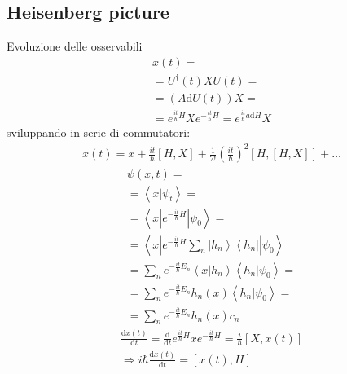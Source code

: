 \subsection{Heisenberg picture} %
Evoluzione delle osservabili
\begin{equation}\begin{split}
x\left(t\right)=\\
=U^\dag\left(t\right) XU\left(t\right)=\\
=\left(A\textrm{d}U\left(t\right)\right)X=\\
=e^{\frac{it}{\hbar }H}Xe^{-\frac{it}{\hbar }H}=e^{\frac{it}{\hbar }a\textrm{d}H}X
\end{split}\end{equation}
sviluppando in serie di commutatori:
\begin{equation}\begin{split}
x\left(t\right)=x+\frac{it}{\hbar }\left[H,X\right]+\frac{1}{2!}\left(\frac{it}{\hbar }\right)^2\left[H,\left[H,X\right]\right]+\dots
\end{split}\end{equation}
\begin{equation}\begin{split}
\psi \left(x,t\right)=\\
=\left\langle x|\psi _t \right\rangle=\\
=\left\langle x|e^{-\frac{it}{\hbar }H}|\psi _0 \right\rangle=\\
=\left\langle x|e^{-\frac{it}{\hbar }H}\sum_n{\left |h_n \right\rangle\left\langle h_n\right |}|\psi _0 \right\rangle\\
=\sum_n{e^{-\frac{it}{\hbar }E_n}\left\langle x|h_n \right\rangle\left\langle h_n|\psi _0 \right\rangle}=\\
=\sum_n{e^{-\frac{it}{\hbar }E_n}h_n\left(x\right)\left\langle h_n|\psi _0 \right\rangle}=\\
=\sum_n{e^{-\frac{it}{\hbar }E_n}h_n\left(x\right)c_n}
\end{split}\end{equation}
\begin{equation}\begin{split}
\frac{\textrm{d}x\left(t\right)}{\textrm{d}t}=\frac{\textrm{d}}{\textrm{d}t}e^{\frac{it}{\hbar }H}xe^{-\frac{it}{\hbar }H}=\frac{i}{\hbar }\left[X,x\left(t\right)\right] \\
\Longrightarrow i\hbar \frac{\textrm{d}x\left(t\right)}{\textrm{d}t}=\left[x\left(t\right),H\right]
\end{split}\end{equation}

